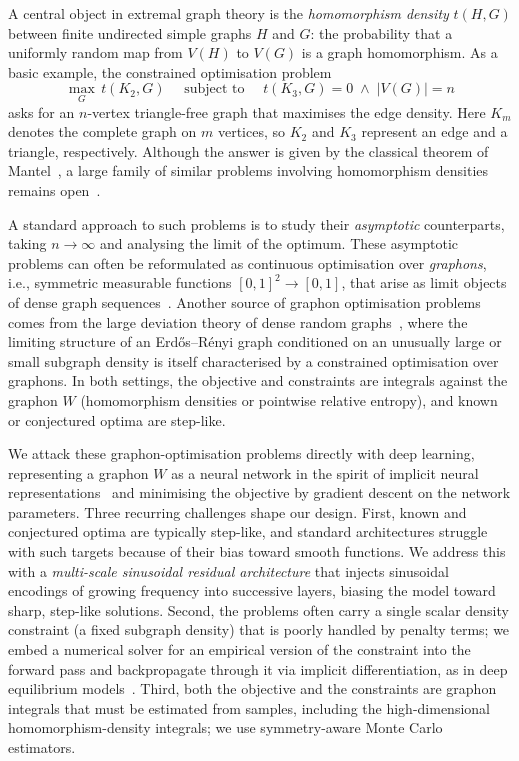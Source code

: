 \documentclass{article}
\theoremstyle{plain}
\theoremstyle{definition}
\theoremstyle{remark}
\begin{document}
A central object in extremal graph theory is the \emph{homomorphism density} $t(H, G)$ between finite undirected simple graphs $H$ and $G$: the probability that a uniformly random map from $V(H)$ to $V(G)$ is a graph homomorphism. As a basic example, the constrained optimisation problem
\begin{equation}
  \max_G\, t(K_2, G)
  \quad\text{ subject to }\quad
  t(K_3, G) = 0 \;\land\; |V(G)| = n
  \label{eqn:mantel}
\end{equation}
asks for an $n$-vertex triangle-free graph that maximises the edge density. Here $K_m$ denotes the complete graph on $m$ vertices, so 
$K_2$ and $K_3$ represent an edge and a triangle, respectively. Although the answer is given by the classical theorem of Mantel~\citep{mantel1907vraagstuk}, a large family of similar problems involving homomorphism densities remains open~\citep{sidorenko1993correlation, borgs2006counting}.

A standard approach to such problems is to study their \emph{asymptotic} counterparts, taking $n \to \infty$ and analysing the limit of the optimum. These asymptotic problems can often be reformulated as continuous optimisation over \emph{graphons}, i.e., symmetric measurable functions $[0,1]^2 \to [0,1]$, that arise as limit objects of dense graph sequences~\citep{lovasz2006limits, lovasz2012large}. Another source of graphon optimisation problems comes from the large deviation theory of dense random graphs~\citep{chatterjee2011large}, where the limiting structure of an Erd\H{o}s--R\'enyi graph conditioned on an unusually large or small subgraph density is itself characterised by a constrained optimisation over graphons. In both settings, the objective and constraints are integrals against the graphon $W$ (homomorphism densities or pointwise relative entropy), and known or conjectured optima are step-like.

We attack these graphon-optimisation problems directly with deep learning, representing a graphon $W$ as a neural network in the spirit of implicit neural representations~\citep{park2019deepsdf,mescheder2019occupancy,chen2019learning} and minimising the objective by gradient descent on the network parameters. Three recurring challenges shape our design. First, known and conjectured optima are typically step-like, and standard architectures struggle with such targets because of their bias toward smooth functions. We address this with a \emph{multi-scale sinusoidal residual architecture} that injects sinusoidal encodings of growing frequency into successive layers, biasing the model toward sharp, step-like solutions. Second, the problems often carry a single scalar density constraint (a fixed subgraph density) that is poorly handled by penalty terms; we embed a numerical solver for an empirical version of the constraint into the forward pass and backpropagate through it via implicit differentiation, as in deep equilibrium models~\citep{bai2019deep}. Third, both the objective and the constraints are graphon integrals that must be estimated from samples, including the high-dimensional homomorphism-density integrals; we use symmetry-aware Monte Carlo estimators.
\end{document}
